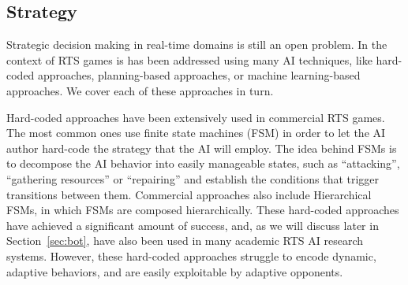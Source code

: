 \documentclass[journal]{IEEEtran}
\begin{document}


\subsection{Strategy}

Strategic decision making in real-time domains is still an open problem. In the context of RTS games is has been addressed using many AI techniques, like hard-coded approaches, planning-based approaches, or machine learning-based approaches. We cover each of these approaches in turn.

Hard-coded approaches have been extensively used in commercial RTS games. The most common ones use finite state machines (FSM) \cite{FSM_AIGameProgWisdom2003} in order to let the AI author hard-code the strategy that the AI will employ. The idea behind FSMs is to decompose the AI behavior into easily manageable states, such as ``attacking'', ``gathering resources'' or ``repairing'' and establish the conditions that trigger transitions between them. Commercial approaches also include Hierarchical FSMs, in which FSMs are composed hierarchically. These hard-coded approaches have achieved a significant amount of success, and, as we will discuss later in Section~\ref{sec:bot}, have also been used in many academic RTS AI research systems. However, these hard-coded approaches struggle to encode dynamic, adaptive behaviors, and are easily exploitable by adaptive opponents.

\end{document}
